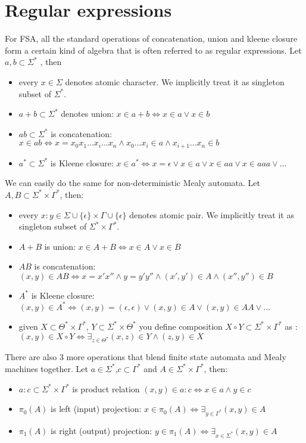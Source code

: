 \documentclass[12pt]{article}
\begin{document}
\section{Regular expressions}
For FSA, all the standard operations of concatenation, union and kleene closure form a certain kind of algebra that is often referred to as regular expressions. 
Let $a,b \subset  \Sigma^*$ , then
\begin{itemize}
	\item every $x \in \Sigma$ denotes atomic character. We implicitly treat it as singleton subset of $\Sigma^*$.
	\item $a+b\subset \Sigma^*$ denotes union: $x\in a+b \iff x\in a \vee x\in b$
	\item $ab\subset \Sigma^*$ is concatenation: $x \in ab \iff x=x_0x_1...x_i...x_n \wedge x_0...x_i \in a \wedge x_{i+1}...x_n \in b$
	\item $a^* \subset \Sigma^*$ is Kleene closure: $x\in a^* \iff x=\epsilon \vee x\in a \vee x\in aa \vee x \in aaa \vee ...$
\end{itemize}  
We can easily do the same for non-deterministic Mealy automata. Let $A,B \subset \Sigma^* \times \Gamma^*$, then:
\begin{itemize}
	\item every $x:y \in \Sigma\cup\{\epsilon\} \times \Gamma\cup\{\epsilon\}$ denotes atomic pair. We implicitly treat it as singleton subset of $\Sigma^* \times \Gamma^*$.
	\item $A + B$ is union: $x \in A + B  \iff x \in A \vee x \in B$
\item $AB$ is concatenation: $(x,y)\in AB \iff x=x'x'' \wedge y=y'y'' \wedge (x',y') \in A \wedge (x'',y'') \in B$
\item $A^*$ is Kleene closure: $(x,y)\in A^* \iff (x,y) = (\epsilon,\epsilon) \vee (x,y) \in A \vee (x,y) \in AA \vee ...$
\item given $X\subset \Theta^*\times\Gamma^*$, $Y\subset \Sigma^*\times\Theta^*$ you define composition $X \circ Y \subset \Sigma^* \times \Gamma^*$ as : $(x,y)\in X \circ Y \iff \exists_{z\in\Theta^*} (x,z)\in Y \wedge (z,y) \in X$
\end{itemize}  
There are also 3 more operations that blend finite state automata and Mealy machines together. Let $a\in\Sigma^*$,$c\subset \Gamma^*$ and $A \in \Sigma^* \times \Gamma^*$, then:
\begin{itemize}
	\item $a:c \subset \Sigma^* \times \Gamma^*$ is product relation $(x,y)\in a:c \iff x\in a\wedge y\in c $
	\item $\pi_0(A)$ is left (input) projection: $x \in \pi_0(A) \iff \exists_{y\in\Gamma^*} (x,y) \in A$
	\item $\pi_1(A)$ is right (output) projection: $y \in \pi_1(A) \iff \exists_{x\in\Sigma^*} (x,y) \in A$
\end{itemize}
\end{document}
